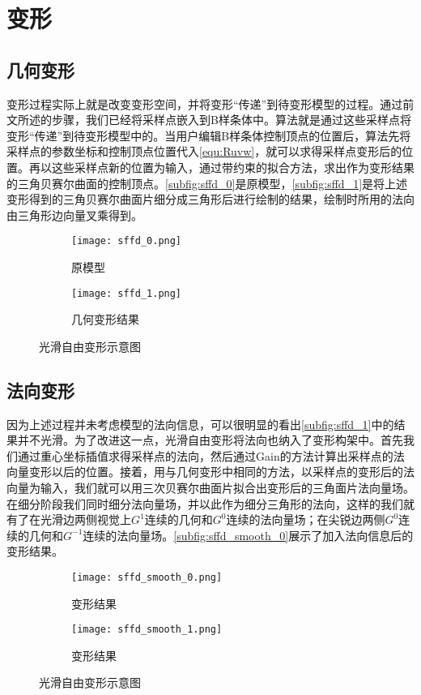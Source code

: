 \section{变形}
\subsection{几何变形}
变形过程实际上就是改变变形空间，并将变形“传递”到待变形模型的过程。通过前文所述的步骤，我们已经将采样点嵌入到B样条体中。算法就是通过这些采样点将变形“传递”到待变形模型中的。当用户编辑B样条体控制顶点的位置后，算法先将采样点的参数坐标和控制顶点位置代入\autoref{equ:Ruvw}，就可以求得采样点变形后的位置。再以这些采样点新的位置为输入，通过带约束的拟合方法，求出作为变形结果的三角贝赛尔曲面的控制顶点。\autoref{subfig:sffd_0}是原模型，\autoref{subfig:sffd_1}是将上述变形得到的三角贝赛尔曲面片细分成三角形后进行绘制的结果，绘制时所用的法向由三角形边向量叉乘得到。

\begin{figure}[htbp]
	\centering
	\begin{subfigure}[b]{.4\textwidth}
		\centering
		\texttt{[image: sffd\_0.png]}
		\caption{原模型}\label{subfig:sffd_0}
	\end{subfigure}
	\quad
	\begin{subfigure}[b]{.4\textwidth}
		\centering
		\texttt{[image: sffd\_1.png]}
		\caption{几何变形结果}\label{subfig:sffd_1}
	\end{subfigure}
    \caption{光滑自由变形示意图}\label{fig:sffd}
\end{figure}

\subsection{法向变形}
因为上述过程并未考虑模型的法向信息，可以很明显的看出\autoref{subfig:sffd_1}中的结果并不光滑。为了改进这一点，光滑自由变形将法向也纳入了变形构架中。首先我们通过重心坐标插值求得采样点的法向，然后通过Gain\cite{gain1999}的方法计算出采样点的法向量变形以后的位置。接着，用与几何变形中相同的方法，以采样点的变形后的法向量为输入，我们就可以用三次贝赛尔曲面片拟合出变形后的三角面片法向量场。在细分阶段我们同时细分法向量场，并以此作为细分三角形的法向，这样的我们就有了在光滑边两侧视觉上$G^1$连续的几何和$G^0$连续的法向量场；在尖锐边两侧$G^0$连续的几何和$G^{-1}$连续的法向量场。\autoref{subfig:sffd_smooth_0}展示了加入法向信息后的变形结果。

\begin{figure}[htbp]
	\centering
	\begin{subfigure}[b]{.4\textwidth}
		\centering
		\texttt{[image: sffd\_smooth\_0.png]}
		\caption{变形结果}\label{subfig:sffd_smooth_0}
	\end{subfigure}
	\quad
	\begin{subfigure}[b]{.4\textwidth}
		\centering
		\texttt{[image: sffd\_smooth\_1.png]}
		\caption{变形结果}\label{subfig:sffd_smooth_1}
	\end{subfigure}
    \caption{光滑自由变形示意图}\label{fig:sffd}
\end{figure}

